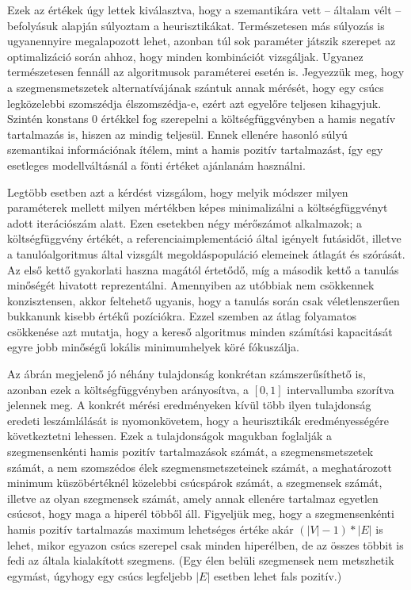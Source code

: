 Ezek az értékek úgy lettek kiválasztva, hogy a szemantikára vett -- általam vélt -- befolyásuk alapján súlyoztam a heurisztikákat. Természetesen más súlyozás is ugyanennyire megalapozott lehet, azonban túl sok paraméter játszik szerepet az optimalizáció során ahhoz, hogy minden kombinációt vizsgáljak. Ugyanez természetesen fennáll az algoritmusok paraméterei esetén is. Jegyezzük meg, hogy a szegmensmetszetek alternatívájának szántuk annak mérését, hogy egy csúcs legközelebbi szomszédja élszomszédja-e, ezért azt egyelőre teljesen kihagyjuk. Szintén konstans 0 értékkel fog szerepelni a költségfüggvényben a hamis negatív tartalmazás is, hiszen az mindig teljesül. Ennek ellenére hasonló súlyú szemantikai információnak ítélem, mint a hamis pozitív tartalmazást, így egy esetleges modellváltásnál a fönti értéket ajánlanám használni.

Legtöbb esetben azt a kérdést vizsgálom, hogy melyik módszer milyen paraméterek mellett milyen mértékben képes minimalizálni a költségfüggvényt adott iterációszám alatt. Ezen esetekben négy mérőszámot alkalmazok; a költségfüggvény értékét, a referenciaimplementáció által igényelt futásidőt, illetve a tanulóalgoritmus által vizsgált megoldáspopuláció elemeinek átlagát és szórását. Az első kettő gyakorlati haszna magától értetődő, míg a második kettő a tanulás minőségét hivatott reprezentálni. Amennyiben az utóbbiak nem csökkennek konzisztensen, akkor feltehető ugyanis, hogy a tanulás során csak véletlenszerűen bukkanunk kisebb értékű pozíciókra. Ezzel szemben az átlag folyamatos csökkenése azt mutatja, hogy a kereső algoritmus minden számítási kapacitását egyre jobb minőségű lokális minimumhelyek köré fókuszálja.

Az ábrán megjelenő jó néhány tulajdonság konkrétan számszerűsíthető is, azonban ezek a költségfüggvényben arányosítva, a $[0,1]$ intervallumba szorítva jelennek meg. A konkrét mérési eredményeken kívül több ilyen tulajdonság eredeti leszámlálását is nyomonkövetem, hogy a heurisztikák eredményességére következtetni lehessen. Ezek a tulajdonságok magukban foglalják a szegmensenkénti hamis pozitív tartalmazások számát, a szegmensmetszetek számát, a nem szomszédos élek szegmensmetszeteinek számát, a meghatározott minimum küszöbértéknél közelebbi csúcspárok számát, a szegmensek számát, illetve az olyan szegmensek számát, amely annak ellenére tartalmaz egyetlen csúcsot, hogy maga a hiperél többől áll. Figyeljük meg, hogy a szegmensenkénti hamis pozitív tartalmazás maximum lehetséges értéke akár $(|V|-1)*|E|$ is lehet, mikor egyazon csúcs szerepel csak minden hiperélben, de az összes többit is fedi az általa kialakított szegmens. (Egy élen belüli szegmensek nem metszhetik egymást, úgyhogy egy csúcs legfeljebb $|E|$ esetben lehet fals pozitív.)

